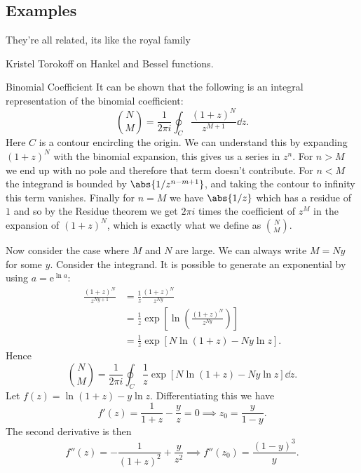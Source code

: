 \documentclass[fleqn]{NotesClass}
\newcommand*{\e}{\mathrm{e}}
\begin{document}
    \subsection{Examples}
    \epigraph{They're all related, its like the royal family}{Kristel Torokoff on Hankel and Bessel functions.}
    \begin{exm}{Binomial Coefficient}{}
        It can be shown that the following is an integral representation of the binomial coefficient:
        \begin{equation}
            \binom{N}{M} = \frac{1}{2\pi i} \oint_C \frac{(1 + z)^N}{z^{M + 1}} \dd{z}.
        \end{equation}
        Here \(C\) is a contour encircling the origin.
        We can understand this by expanding \((1 + z)^N\) with the binomial expansion, this gives us a series in \(z^n\).
        For \(n > M\) we end up with no pole and therefore that term doesn't contribute.
        For \(n < M\) the integrand is bounded by \(\abs{1/z^{n - m + 1}}\), and taking the contour to infinity this term vanishes.
        Finally for \(n = M\) we have \(\abs{1/z}\) which has a residue of \(1\) and so by the Residue theorem we get \(2\pi i\) times the coefficient of \(z^{M}\) in the expansion of \((1 + z)^{N}\), which is exactly what we define as \(\binom{N}{M}\).
        
        Now consider the case where \(M\) and \(N\) are large.
        We can always write \(M = Ny\) for some \(y\).
        Consider the integrand.
        It is possible to generate an exponential by using \(a = \e^{\ln a}\):
        \begin{align}
            \frac{(1 + z)^{N}}{z^{Ny + 1}} &= \frac{1}{z} \frac{(1 + z)^N}{z^{Ny}}\\
            &= \frac{1}{z}\exp\left[ \ln\left( \frac{(1 + z)^{N}}{z^{Ny}} \right) \right]\\
            &= \frac{1}{z}\exp[N\ln(1 + z) - Ny\ln z].
        \end{align}
        Hence
        \begin{equation}
            \binom{N}{M} = \frac{1}{2\pi i} \oint_C \frac{1}{z} \exp[N\ln(1 + z) - Ny\ln z] \dd{z}.
        \end{equation}
        Let \(f(z) = \ln(1 + z) - y\ln z\).
        Differentiating this we have
        \begin{equation}
            f'(z) = \frac{1}{1 + z} - \frac{y}{z} = 0 \implies z_0 = \frac{y}{1 - y}.
        \end{equation}
        The second derivative is then
        \begin{equation}
            f''(z) = -\frac{1}{(1 + z)^2} + \frac{y}{z^2} \implies f''(z_0) = \frac{(1 - y)^3}{y}.
        \end{equation}
        

\end{exm}
\end{document}
